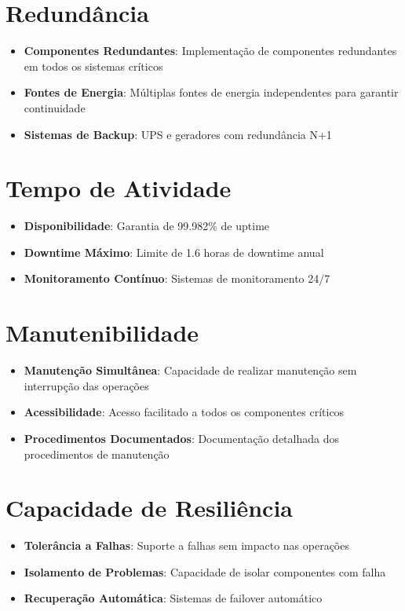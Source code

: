 \documentclass[
	12pt,				%
	oneside,			%
	a4paper,			%
	english,			%
	brazil				%
	]{abntex2unama}
\begin{document}
\section{Redundância}
\begin{itemize}
	\item \textbf{Componentes Redundantes}: Implementação de componentes redundantes em todos os sistemas críticos
	\item \textbf{Fontes de Energia}: Múltiplas fontes de energia independentes para garantir continuidade
	\item \textbf{Sistemas de Backup}: UPS e geradores com redundância N+1
\end{itemize}

\section{Tempo de Atividade}
\begin{itemize}
	\item \textbf{Disponibilidade}: Garantia de 99.982\% de uptime
	\item \textbf{Downtime Máximo}: Limite de 1.6 horas de downtime anual
	\item \textbf{Monitoramento Contínuo}: Sistemas de monitoramento 24/7
\end{itemize}

\section{Manutenibilidade}
\begin{itemize}
	\item \textbf{Manutenção Simultânea}: Capacidade de realizar manutenção sem interrupção das operações
	\item \textbf{Acessibilidade}: Acesso facilitado a todos os componentes críticos
	\item \textbf{Procedimentos Documentados}: Documentação detalhada dos procedimentos de manutenção
\end{itemize}

\section{Capacidade de Resiliência}
\begin{itemize}
	\item \textbf{Tolerância a Falhas}: Suporte a falhas sem impacto nas operações
	\item \textbf{Isolamento de Problemas}: Capacidade de isolar componentes com falha
	\item \textbf{Recuperação Automática}: Sistemas de failover automático
\end{itemize}
\end{document}
